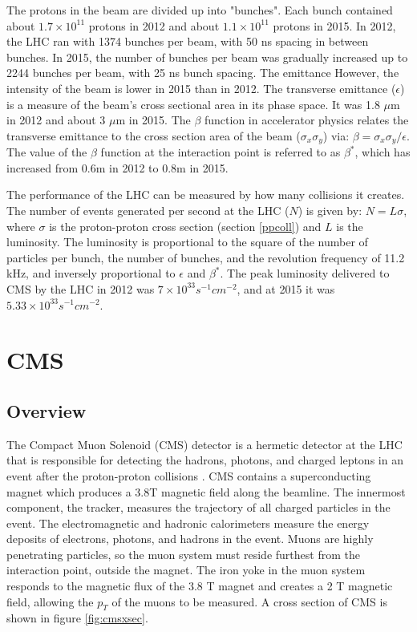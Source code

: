 \documentclass[oneside, letterpaper, oldfontcommands]{memoir}
\begin{document}
\qquad The protons in the beam are divided up into "bunches". Each bunch contained about $1.7 \times 10^{11}$ protons in 2012 and about $1.1 \times 10^{11}$ protons in 2015. In 2012, the LHC ran with 1374 bunches per beam, with 50 ns spacing in between bunches. In 2015, the number of bunches per beam was gradually increased up to 2244 bunches per beam, with 25 ns bunch spacing. The emittance  However, the intensity of the beam is lower in 2015 than in 2012. The transverse emittance ($\epsilon$) is a measure of the beam's cross sectional area in its phase space. It was 1.8 $\mu$m in 2012 and about 3 $\mu$m in 2015. The $\beta$ function in accelerator physics relates the transverse emittance to the cross section area of the beam ($\sigma_{x}\sigma_{y}$) via: $ \beta	= \sigma_{x}\sigma_{y} / \epsilon$. The value of the $\beta$ function at the interaction point is referred to as $\beta^{*}$, which has increased from 0.6m in 2012 to 0.8m in 2015.

\qquad The performance of the LHC can be measured by how many collisions it creates. The number of events generated per second at the LHC ($N$) is given by: $N = L\sigma$, where $\sigma$ is the proton-proton cross section (section \ref{ppcoll}) and $L$ is the luminosity. The luminosity is proportional to the square of the number of particles per bunch, the number of bunches, and the revolution frequency of 11.2 kHz, and inversely proportional to $\epsilon$ and $\beta^{*}$. The peak luminosity delivered to CMS by the LHC in 2012 was $7 \times 10^{33} s^{-1} cm^{-2}$, and at 2015 it was $5.33 \times 10^{33} s^{-1} cm^{-2}$. 


\section{CMS}\label{cms}
\subsection{Overview}

\qquad The Compact Muon Solenoid (CMS) detector is a hermetic detector at the LHC that is responsible for detecting the hadrons, photons, and charged leptons in an event after the proton-proton collisions \cite{1748-0221-3-08-S08001}. CMS contains a superconducting magnet which produces a 3.8T magnetic field along the beamline. The innermost component, the tracker, measures the trajectory of all charged particles in the event. The electromagnetic and hadronic calorimeters measure the energy deposits of electrons, photons, and hadrons in the event. Muons are highly penetrating particles, so the muon system must reside furthest from the interaction point, outside the magnet. The iron yoke in the muon system responds to the magnetic flux of the 3.8 T magnet and creates a 2 T magnetic field, allowing the $p_{T}$ of the muons to be measured. A cross section of CMS is shown in figure \ref{fig:cmsxsec}. 
\end{document}
